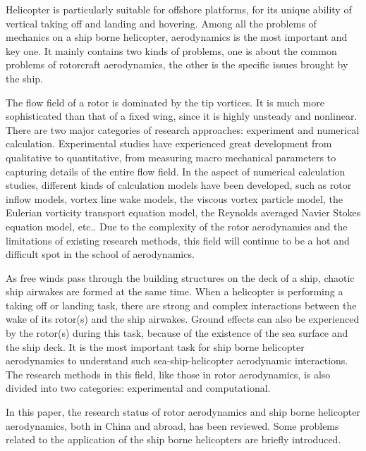 \begin{eabstract}
Helicopter is particularly suitable for offshore platforms, for its unique ability of vertical taking off and landing and hovering.
Among all the problems of mechanics on a ship borne helicopter, aerodynamics is the most important and key one.
It mainly contains two kinds of problems, one is about the common problems of rotorcraft aerodynamics, the other is the specific issues brought by the ship.

The flow field of a rotor is dominated by the tip vortices.
It is much more sophisticated than that of a fixed wing, since it is highly unsteady and nonlinear.
There are two major categories of research approaches: experiment and numerical calculation.
Experimental studies have experienced great development from qualitative to quantitative, from measuring macro mechanical parameters to capturing details of the entire flow field.
In the aspect of numerical calculation studies, different kinds of calculation models have been developed, such as rotor inflow models, vortex line wake models, the viscous vortex particle model, 
the Eulerian vorticity transport equation model, the Reynolds averaged Navier Stokes equation model, etc..
Due to the complexity of the rotor aerodynamics and the limitations of existing research methods, this field will continue to be a hot and difficult spot in the school of aerodynamics.

As free winds pass through the building structures on the deck of a ship, chaotic ship airwakes are formed at the same time.
When a helicopter is performing a taking off or landing task, there are strong and complex interactions between the wake of its rotor(s) and the ship airwakes.
Ground effects can also be experienced by the rotor(s) during this task, because of the existence of the sea surface and the ship deck.
It is the most important task for ship borne helicopter aerodynamics to understand such sea-ship-helicopter aerodynamic interactions. 
The research methods in this field, like those in rotor aerodynamics, is also divided into two categories: experimental and computational.

In this paper, the research status of rotor aerodynamics and ship borne helicopter aerodynamics, both in China and abroad, has been reviewed.
Some problems related to the application of the ship borne helicopters are briefly introduced.
\end{eabstract}
